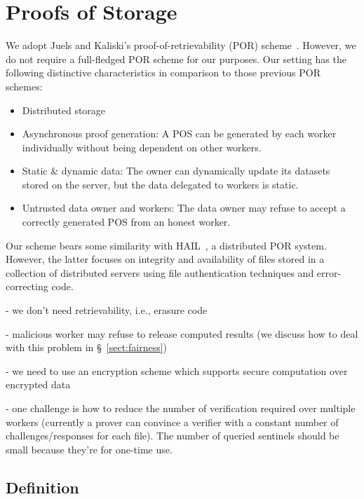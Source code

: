 \section{Proofs of Storage} \label{sect:pos}

We adopt Juels and Kaliski's proof-of-retrievability (POR) scheme~\cite{JK07}.
However, we do not require a full-fledged POR scheme for our purposes.
Our setting has the following distinctive characteristics in comparison to those previous POR schemes:
\begin{itemize}
 \item Distributed storage
 \item Asynchronous proof generation: A POS can be generated by each worker individually without being dependent on other workers.
 \item Static \& dynamic data: The owner can dynamically update its datasets stored on the server, but the data delegated to workers is static.
 \item Untrusted data owner and workers: The data owner may refuse to accept a correctly generated POS from an honest worker.
\end{itemize}

Our scheme bears some similarity with HAIL~\cite{BJO09b}, a distributed POR system.
However, the latter focuses on integrity and availability of files stored in a collection of distributed servers using file authentication techniques and error-correcting code.

- we don't need retrievability, i.e., erasure code

- malicious worker may refuse to release computed results (we discuss how to deal with this problem in \S~\ref{sect:fairness})

- we need to use an encryption scheme which supports secure computation over encrypted data

- one challenge is how to reduce the number of verification required over multiple workers (currently a prover can convince a verifier with a constant number of challenges/responses for each file). The number of queried sentinels should be small because they're for one-time use.

\subsection{Definition} \label{sect:pos-definition}

